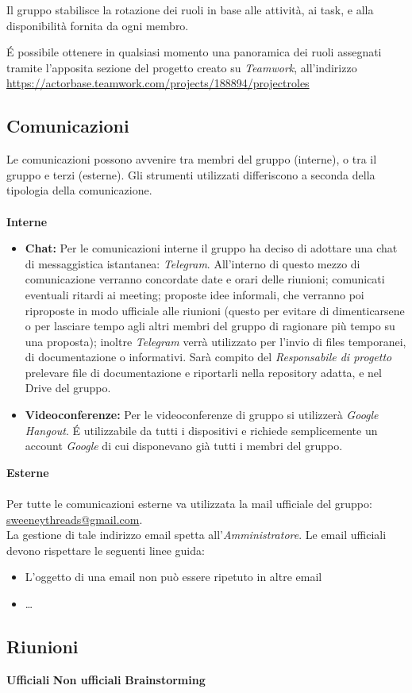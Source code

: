 \documentclass[a4paper]{report}
\begin{document}
				Il gruppo stabilisce la rotazione dei ruoli in base alle attività, ai task, e alla disponibilità fornita da ogni membro.

				\'E possibile ottenere in qualsiasi momento una panoramica dei ruoli assegnati tramite l'apposita sezione del 
				progetto creato su \emph{Teamwork}, all'indirizzo 
				\url{https://actorbase.teamwork.com/projects/188894/projectroles} 
			\subsection{Comunicazioni}
				Le comunicazioni possono avvenire tra membri del gruppo (interne), o tra il gruppo e terzi (esterne). Gli
				 strumenti utilizzati differiscono a seconda della tipologia della comunicazione. \\ \\
				\textbf{Interne} 
					\begin{itemize}
						\item \textbf{Chat:} Per le comunicazioni interne il gruppo ha deciso di adottare una chat di messaggistica istantanea: \emph{Telegram}. All'interno di
						questo mezzo di comunicazione verranno concordate date e orari delle riunioni; comunicati eventuali ritardi ai meeting; proposte idee 
						informali, che verranno poi riproposte in modo ufficiale alle riunioni (questo per evitare di dimenticarsene o per lasciare tempo agli
						altri membri del gruppo di ragionare più tempo su una proposta); inoltre \emph{Telegram} verrà utilizzato per l'invio di files
						temporanei, di documentazione o informativi. Sarà compito del \emph{Responsabile di progetto} prelevare file di documentazione 
						e riportarli nella repository adatta, e nel Drive del gruppo.
						\item \textbf{Videoconferenze:} Per le videoconferenze di gruppo si utilizzerà \emph{Google Hangout}. 
						\'E utilizzabile da tutti i dispositivi e richiede semplicemente un account \emph{Google} di cui disponevano 
						già tutti i membri del gruppo.
					\end{itemize}
				\textbf{Esterne}  \\ \\ %
					Per tutte le comunicazioni esterne va utilizzata la mail ufficiale del gruppo: \url{sweeneythreads@gmail.com}. \\ La gestione di tale indirizzo email spetta all'\emph{Amministratore}.
					Le email ufficiali devono rispettare le seguenti linee guida:
					\begin{itemize}
						\item L'oggetto di una email non può essere ripetuto in altre email
						\item \dots
					\end{itemize}										
			\subsection{Riunioni}
				\textbf{Ufficiali} %
				\textbf{Non ufficiali}
				\textbf{Brainstorming}
\end{document}

